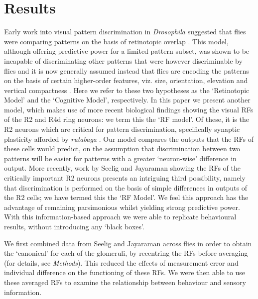 
\section{Results}
Early work into visual pattern discrimination in \emph{Drosophila} suggested that flies were comparing patterns on the basis of retinotopic overlap \cite{Dill1995,Dill1993}.
This model, although offering predictive power for a limited pattern subset, was shown to be incapable of discriminating other patterns that were however discriminable by flies \cite{Ernst1999} and it is now generally assumed instead that flies are encoding the patterns on the basis of certain higher-order features, viz. size, orientation, elevation and vertical compactness \cite{Ernst1999,Liu2006,Pan2009}.
Here we refer to these two hypotheses as the `Retinotopic Model' and the `Cognitive Model', respectively.
In this paper we present another model, which makes use of more recent biological findings \cite{Seelig2013} showing the visual RFs of the R2 and R4d ring neurons: we term this the `RF model'.
Of these, it is the R2 neurons which are critical for pattern discrimination, specifically synaptic plasticity afforded by \emph{rutabaga} \cite{Pan2009,Wang2008,Liu2006,Ernst1999}.
Our model compares the outputs that the RFs of these cells would predict, on the assumption that discrimination between two patterns will be easier for patterns with a greater `neuron-wise' difference in output.
More recently, work by Seelig and Jayaraman \cite{Seelig2013} showing the RFs of the critically important R2 neurons presents an intriguing third possibility, namely that discrimination is performed on the basis of simple differences in outputs of the R2 cells; we have termed this the `RF Model'.
We feel this approach has the advantage of remaining parsimonious whilst yielding strong predictive power.
With this information-based approach we were able to replicate behavioural results, without introducing any `black boxes'.

We first combined data from Seelig and Jayaraman \cite{Seelig2013} across flies in order to obtain the `canonical' for each of the glomeruli, by recentring the RFs before averaging (for details, see \emph{Methods}).
This reduced the effects of measurement error and individual difference on the functioning of these RFs.
We were then able to use these averaged RFs to examine the relationship between behaviour and sensory information.

